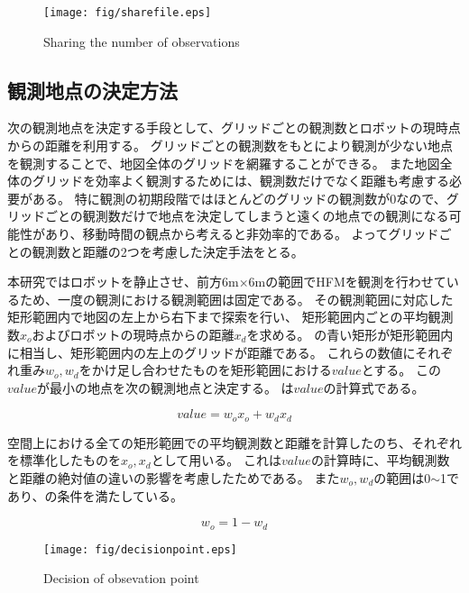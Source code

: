 \documentclass{jsarticle}
\begin{document}
\begin{figure}[tbh]
 \centering
  \texttt{[image: fig/sharefile.eps]}
  \vspace*{-4mm}
  \caption{Sharing the number of observations}
  \label{fig: sharefile}
\end{figure}


\subsection{観測地点の決定方法}
\label{decide}
次の観測地点を決定する手段として、グリッドごとの観測数とロボットの現時点からの距離を利用する。
グリッドごとの観測数をもとにより観測が少ない地点を観測することで、地図全体のグリッドを網羅することができる。
また地図全体のグリッドを効率よく観測するためには、観測数だけでなく距離も考慮する必要がある。
特に観測の初期段階ではほとんどのグリッドの観測数が0なので、グリッドごとの観測数だけで地点を決定してしまうと遠くの地点での観測になる可能性があり、移動時間の観点から考えると非効率的である。
よってグリッドごとの観測数と距離の2つを考慮した決定手法をとる。

本研究ではロボットを静止させ、前方6m$\times$6mの範囲でHFMを観測を行わせているため、一度の観測における観測範囲は固定である。
その観測範囲に対応した矩形範囲内で地図の左上から右下まで探索を行い、
矩形範囲内ごとの平均観測数$x_{o}$およびロボットの現時点からの距離$x_{d}$を求める。
の青い矩形が矩形範囲内に相当し、矩形範囲内の左上のグリッドが距離である。
これらの数値にそれぞれ重み$w_{o},w_{d}$をかけ足し合わせたものを矩形範囲における$value$とする。
この$value$が最小の地点を次の観測地点と決定する。
は$value$の計算式である。

\begin{equation}
  value = w_{o}x_{o} + w_{d}x_{d}
	\label{eqn: value}
\end{equation}

空間上における全ての矩形範囲での平均観測数と距離を計算したのち、それぞれを標準化したものを$x_o,x_d$として用いる。
これは$value$の計算時に、平均観測数と距離の絶対値の違いの影響を考慮したためである。
また$w_o,w_d$の範囲は0$\sim$1であり、の条件を満たしている。

\begin{equation}
  w_o = 1 - w_d
	\label{eqn: weight}
\end{equation}


\begin{figure}[tbh]
 \centering
  \texttt{[image: fig/decisionpoint.eps]}
  \vspace*{-4mm}
  \caption{Decision of obsevation point}
  \label{fig: value-method}
\end{figure}
\end{document}
